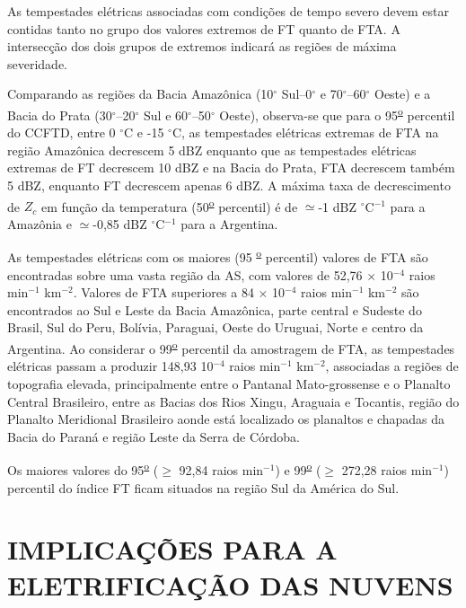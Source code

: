 As tempestades elétricas associadas com condições de tempo severo devem estar contidas tanto no grupo dos valores extremos de FT quanto de FTA. A intersecção dos dois grupos de extremos indicará as regiões de máxima severidade. %

Comparando as regiões da Bacia Amazônica (10$^{\circ}$ Sul--0$^{\circ}$ e 70$^{\circ}$--60$^{\circ}$ Oeste) e a Bacia do Prata (30$^{\circ}$--20$^{\circ}$ Sul e 60$^{\circ}$--50$^{\circ}$ Oeste), observa-se que para o 95\textsuperscript{\underline{o}} percentil do CCFTD, entre 0 $^{\circ}$C e -15 $^{\circ}$C, as tempestades elétricas extremas de FTA na região Amazônica decrescem 5 dBZ enquanto que as tempestades elétricas extremas de FT decrescem 10 dBZ e na Bacia do Prata, FTA decrescem também 5 dBZ, enquanto FT decrescem apenas 6 dBZ. A máxima taxa de decrescimento de $Z_c$ em função da temperatura (50\textsuperscript{\underline{o}} percentil) é de $\simeq$-1 dBZ $^{\circ}$C$^{-1}$ para a Amazônia e $\simeq$-0,85 dBZ $^{\circ}$C$^{-1}$ para a Argentina.


As tempestades elétricas com os maiores (95 \textsuperscript{\underline{o}} percentil) valores de FTA são encontradas sobre uma vasta região da AS, com valores de 52,76 $\times$ 10$^{-4}$ raios min$^{-1}$ km$^{-2}$. Valores de FTA superiores a 84 $\times$ 10$^{-4}$ raios min$^{-1}$ km$^{-2}$ são encontrados ao Sul e Leste da Bacia Amazônica, parte central e Sudeste do Brasil, Sul do Peru, Bolívia, Paraguai, Oeste do Uruguai, Norte e centro da Argentina. Ao considerar o 99\textsuperscript{\underline{o}} percentil da amostragem de FTA, as tempestades elétricas passam a produzir 148,93 10$^{-4}$ raios min$^{-1}$ km$^{-2}$, associadas a regiões de topografia elevada, principalmente entre o Pantanal Mato-grossense e o Planalto Central Brasileiro, entre as Bacias dos Rios Xingu, Araguaia e Tocantis, região do Planalto Meridional Brasileiro aonde está localizado os planaltos e chapadas da Bacia do Paraná e região Leste da Serra de Córdoba.


Os maiores valores do 95\textsuperscript{\underline{o}} ($\geq$ 92,84 raios min$^{-1}$) e 99\textsuperscript{\underline{o}} ($\geq$ 272,28 raios min$^{-1}$) percentil do índice FT ficam situados na região Sul da América do Sul.




\section{IMPLICAÇÕES PARA A ELETRIFICAÇÃO DAS NUVENS}


